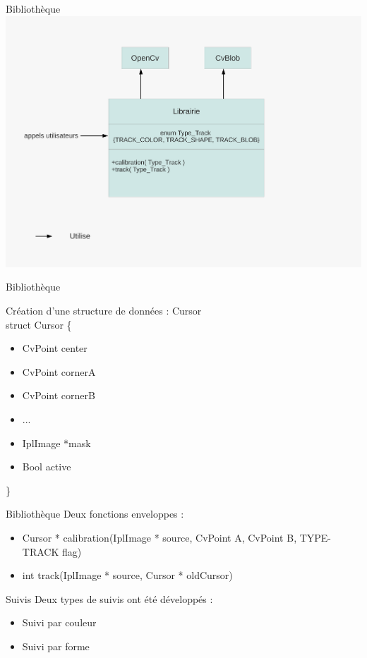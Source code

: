 \documentclass{beamer}
\begin{document}
		\begin{frame}{Bibliothèque}
			\includegraphics[scale=0.40]{schema-librairie.pdf}
		\end{frame}

		\begin{frame}{Bibliothèque}

		Création d'une structure de données : Cursor\\
		struct Cursor \{
		\begin{itemize}
			\item{CvPoint center}
			\item{CvPoint cornerA}
			\item{CvPoint cornerB}
			\item{...}
			\item{IplImage *mask}
			\item{Bool active}
		\end{itemize}
		\} \\
		\end{frame}
		
		\begin{frame}{Bibliothèque}
		Deux fonctions enveloppes : \\
			\begin{itemize}
				\item{Cursor * calibration(IplImage * source, CvPoint A, CvPoint B, TYPE-TRACK flag)}
				\item{int track(IplImage * source, Cursor * oldCursor)}
			\end{itemize}		
		\end{frame}

		\begin{frame}{Suivis}
		Deux types de suivis ont été développés : \\
			\begin{itemize}
				\item{Suivi par couleur}
				\item{Suivi par forme}
			\end{itemize}
		\end{frame}
\end{document}
